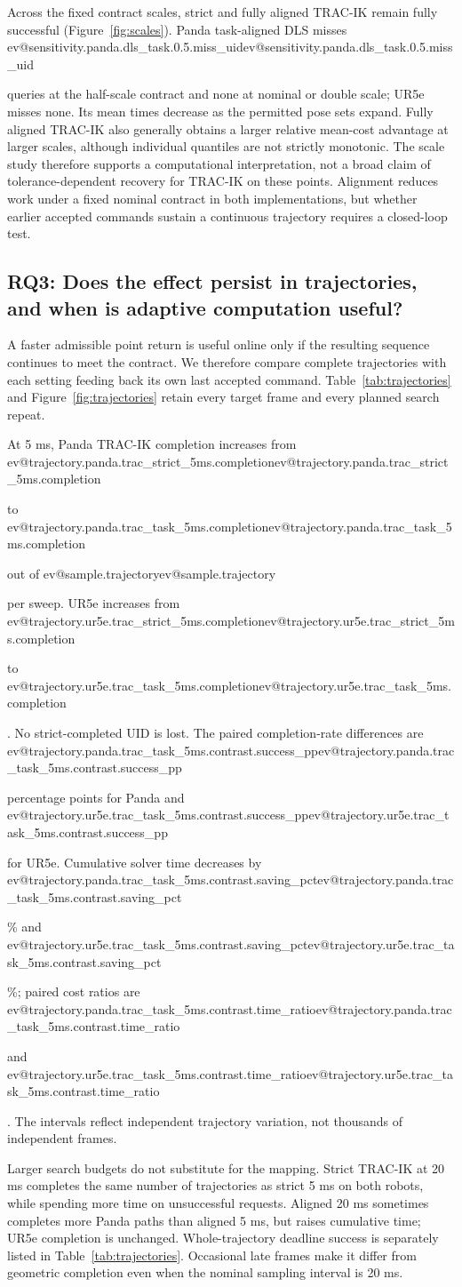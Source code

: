 \documentclass[10pt,a4paper]{article}
\makeatletter
\newcommand{\ev}[1]{\ifcsname ev@#1\endcsname\csname ev@#1\endcsname\else\PackageError{evidence}{Undefined evidence key #1}{}\fi}
\makeatother
\begin{document}
Across the fixed contract scales, strict and fully aligned TRAC-IK remain fully
successful (Figure~\ref{fig:scales}). Panda task-aligned DLS misses
\ev{sensitivity.panda.dls_task.0.5.miss_uid} queries at
the half-scale contract and none at nominal or double scale; UR5e misses none.
Its mean times decrease as the permitted pose sets expand.
Fully aligned TRAC-IK also generally obtains a larger relative mean-cost advantage
at larger scales, although individual quantiles are not strictly monotonic.
The scale study therefore supports a computational interpretation, not a broad
claim of tolerance-dependent recovery for TRAC-IK on these points.
Alignment reduces work under a fixed nominal contract in both implementations,
but whether earlier accepted commands sustain a continuous trajectory requires
a closed-loop test.

\subsection{RQ3: Does the effect persist in trajectories, and when is adaptive computation useful?}
\label{sec:rq3}

A faster admissible point return is useful online only if the resulting sequence
continues to meet the contract. We therefore compare complete trajectories with
each setting feeding back its own last accepted command. Table~\ref{tab:trajectories}
and Figure~\ref{fig:trajectories} retain every target frame and every planned
search repeat.

At 5 ms, Panda TRAC-IK completion increases from
\ev{trajectory.panda.trac_strict_5ms.completion} to
\ev{trajectory.panda.trac_task_5ms.completion} out of
\ev{sample.trajectory} per sweep.
UR5e increases from \ev{trajectory.ur5e.trac_strict_5ms.completion} to
\ev{trajectory.ur5e.trac_task_5ms.completion}.
No strict-completed UID is lost. The paired completion-rate differences are
\ev{trajectory.panda.trac_task_5ms.contrast.success_pp} percentage points for Panda
and \ev{trajectory.ur5e.trac_task_5ms.contrast.success_pp} for UR5e.
Cumulative solver time decreases by
\ev{trajectory.panda.trac_task_5ms.contrast.saving_pct}\% and
\ev{trajectory.ur5e.trac_task_5ms.contrast.saving_pct}\%;
paired cost ratios are \ev{trajectory.panda.trac_task_5ms.contrast.time_ratio} and
\ev{trajectory.ur5e.trac_task_5ms.contrast.time_ratio}.
The intervals reflect independent trajectory variation, not thousands of
independent frames.

Larger search budgets do not substitute for the mapping.
Strict TRAC-IK at 20 ms completes the same number of trajectories as strict 5 ms
on both robots, while spending more time on unsuccessful requests.
Aligned 20 ms sometimes completes more Panda paths than aligned 5 ms, but raises
cumulative time; UR5e completion is unchanged.
Whole-trajectory deadline success is separately listed in
Table~\ref{tab:trajectories}. Occasional late frames make it differ from geometric
completion even when the nominal sampling interval is 20 ms.
\end{document}
